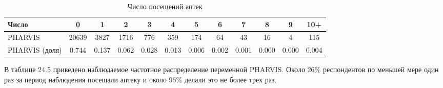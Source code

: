  
\begin{table}
\caption{\label{tab:pred} Число посещений аптек}
\begin{center}
\begin{tabular}{lccccccccccc}
\hline
\hline
Число & 0 & 1 & 2 & 3 & 4 & 5 & 6 & 7 & 8 & 9 & 10+ \\
\hline
PHARVIS & 20639 & 3827 & 1716 & 776 & 359 & 174 & 64 & 43 & 16 & 4 & 115 \\
PHARVIS (доля) & 0.744 & 0.137 & 0.062 & 0.028 & 0.013 & 0.006 & 0.002 & 0.001 & 0.000 & 0.000 & 0.004 \\
\hline
\hline
\end{tabular}
\end{center}
\end{table}

В таблице 24.5 приведено наблюдаемое частотное распределение переменной PHARVIS. Около $26\%$ респондентов по меньшей мере один раз за период наблюдения посещали аптеку и около $95\%$ делали это не более трех раз. 


